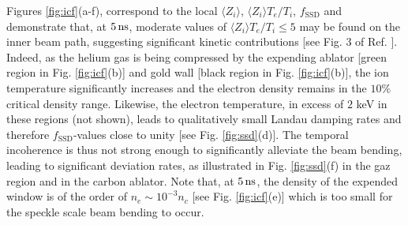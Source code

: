 \documentclass[%
 reprint,
 amsmath,amssymb,
 aps,
]{revtex4-1}
\begin{document}
Figures \ref{fig:icf}(a-f), correspond to the local $\langle Z_i\rangle$, $\langle Z_i\rangle T_e/T_i$, $f_\mathrm{SSD}$ and demonstrate that, at $5\, \rm ns$, moderate values of $\langle Z_i\rangle T_e/T_i\le 5$ may be found on the inner beam path, suggesting significant kinetic contributions [see Fig. 3 of Ref. \cite{POP_Ruyer_2020}]. Indeed, as the helium gas is being compressed by the expending  ablator [green region in Fig. \ref{fig:icf}(b)] and gold wall [black region in Fig. \ref{fig:icf}(b)], the ion temperature significantly increases and the electron density remains in the $10\%$ critical density range. Likewise, the electron temperature, in excess of $2$ keV in these regions (not shown), leads to qualitatively small Landau damping rates and  therefore $f_\mathrm{SSD}$-values close to unity [see Fig. \ref{fig:ssd}(d)]. 
The temporal incoherence is thus not strong enough to significantly alleviate the beam bending, leading to significant deviation rates, as illustrated in Fig. \ref{fig:ssd}(f) in the gaz region and in the carbon ablator. 
%
Note that, at $5\,\rm  ns$, the density of the expended window is of the order of $n_e\sim 10^{-3}n_c$  [see Fig. \ref{fig:icf}(e)]  which is too small for the speckle scale beam bending to occur.
\end{document}
